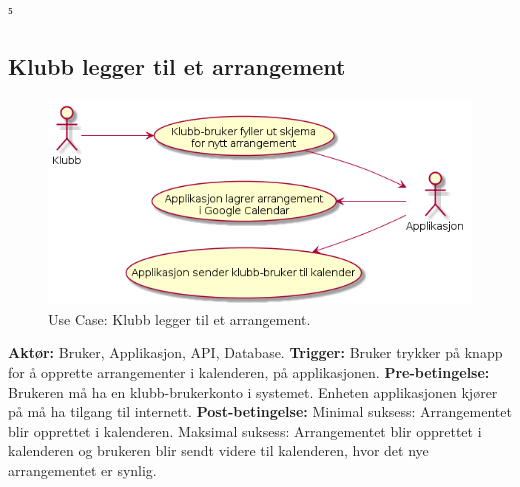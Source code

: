 ⁵\documentclass[norsk]{article}
\begin{document}
    \subsection{Klubb legger til et arrangement} 
    \begin{figure}[H]
    \centering
        \includegraphics[scale=0.7]{images/uc-klubb-legger-til-arrangement.png}
        \caption{Use Case: Klubb legger til et arrangement.}\label{fig:uc-add-event}
    \end{figure}
    \textbf{Aktør:} Bruker, Applikasjon, API, Database.\newline
        \textbf{Trigger:} Bruker trykker på knapp for å opprette arrangementer i kalenderen, på applikasjonen.\newline
        \textbf{Pre-betingelse:} Brukeren må ha en klubb-brukerkonto i systemet. Enheten applikasjonen kjører på må ha tilgang til internett.\newline
        \textbf{Post-betingelse:} \newline
        Minimal suksess: Arrangementet blir opprettet i kalenderen.\newline
        Maksimal suksess: Arrangementet blir opprettet i kalenderen og brukeren blir sendt videre til kalenderen, hvor det nye arrangementet er synlig. \newline
\end{document}
